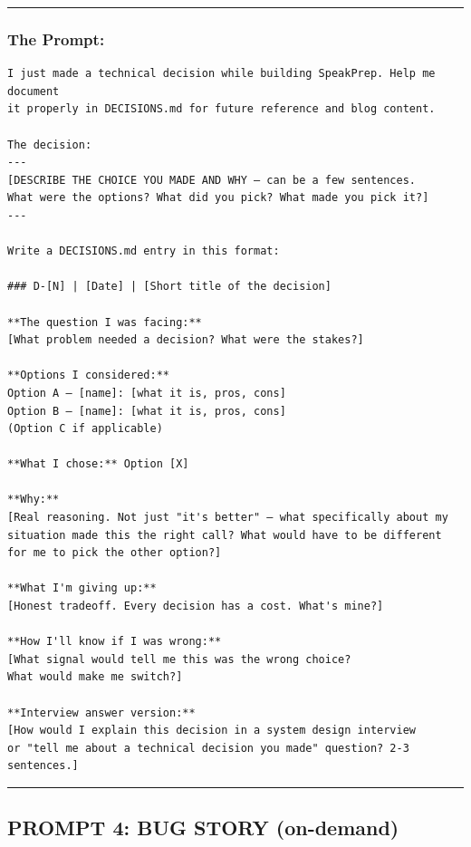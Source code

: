 \documentclass[
  11pt,
]{article}
\begin{document}
\begin{center}\rule{0.5\linewidth}{0.5pt}\end{center}

\hypertarget{the-prompt-2}{%
\subsubsection{The Prompt:}\label{the-prompt-2}}

\begin{lstlisting}
I just made a technical decision while building SpeakPrep. Help me document
it properly in DECISIONS.md for future reference and blog content.

The decision:
---
[DESCRIBE THE CHOICE YOU MADE AND WHY — can be a few sentences.
What were the options? What did you pick? What made you pick it?]
---

Write a DECISIONS.md entry in this format:

### D-[N] | [Date] | [Short title of the decision]

**The question I was facing:**
[What problem needed a decision? What were the stakes?]

**Options I considered:**
Option A — [name]: [what it is, pros, cons]
Option B — [name]: [what it is, pros, cons]
(Option C if applicable)

**What I chose:** Option [X]

**Why:**
[Real reasoning. Not just "it's better" — what specifically about my
situation made this the right call? What would have to be different
for me to pick the other option?]

**What I'm giving up:**
[Honest tradeoff. Every decision has a cost. What's mine?]

**How I'll know if I was wrong:**
[What signal would tell me this was the wrong choice?
What would make me switch?]

**Interview answer version:**
[How would I explain this decision in a system design interview
or "tell me about a technical decision you made" question? 2-3 sentences.]
\end{lstlisting}

\begin{center}\rule{0.5\linewidth}{0.5pt}\end{center}

\hypertarget{prompt-4-bug-story-on-demand}{%
\subsection{PROMPT 4: BUG STORY
(on-demand)}\label{prompt-4-bug-story-on-demand}}
\end{document}
